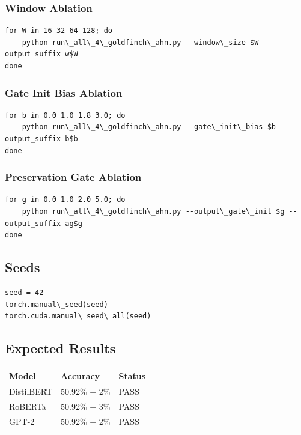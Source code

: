 \subsubsection{Window Ablation}

\begin{lstlisting}
for W in 16 32 64 128; do
    python run\_all\_4\_goldfinch\_ahn.py --window\_size $W --output_suffix w$W
done
\end{lstlisting}

\subsubsection{Gate Init Bias Ablation}

\begin{lstlisting}
for b in 0.0 1.0 1.8 3.0; do
    python run\_all\_4\_goldfinch\_ahn.py --gate\_init\_bias $b --output_suffix b$b
done
\end{lstlisting}

\subsubsection{Preservation Gate Ablation}

\begin{lstlisting}
for g in 0.0 1.0 2.0 5.0; do
    python run\_all\_4\_goldfinch\_ahn.py --output\_gate\_init $g --output_suffix ag$g
done
\end{lstlisting}

\subsection{Seeds}

\begin{lstlisting}
seed = 42
torch.manual\_seed(seed)
torch.cuda.manual\_seed\_all(seed)
\end{lstlisting}

\subsection{Expected Results}

\begin{table}[H]
\centering
\small
\begin{tabular}{lll}
\toprule
\textbf{Model} & \textbf{Accuracy} & \textbf{Status} \\
\midrule
DistilBERT & 50.92\% $\pm$ 2\% & PASS \\
RoBERTa & 50.92\% $\pm$ 3\% & PASS \\
GPT-2 & 50.92\% $\pm$ 2\% & PASS \\
\bottomrule
\end{tabular}
\end{table}

